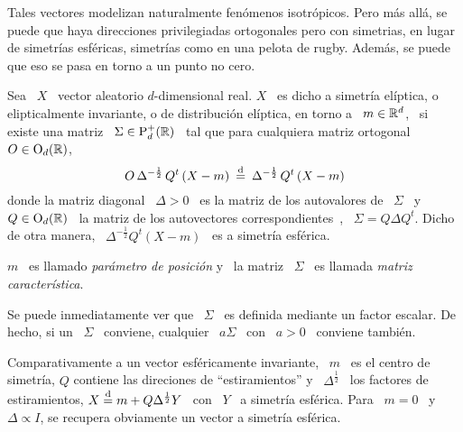 Tales  vectores  modelizan naturalmente  fen\'omenos  isotr\'opicos. Pero  m\'as
all\'a,  se  puede  que  haya  direcciones privilegiadas  ortogonales  pero  con
simetrias,  \ie en  lugar de  simetr\'ias esf\'ericas,  simetr\'ias como  en una
pelota de rugby. Adem\'as, se puede que eso se pasa en torno a un punto no cero.
%
\begin{definicion}
%
  Sea  \  $X$  \ vector  aleatorio  $d$-dimensional  real.   $X$  \ es  dicho  a
  simetr\'ia  el\'iptica,  o  elipticalmente  invariante,  o  de  distribuci\'on
  el\'iptica, en torno a \ $m \in \mathbb{R}^d$, \ si existe una matriz \ $\Sigma \in
  \mathrm{P}_d^+(\mathbb{R})$  \  tal  que  para   cualquiera  matriz  ortogonal  \  $O  \in
  \mathrm{O}_d(\mathbb{R})$,
  \[
  O  \,   \Delta^{-\frac12}  \,  Q^t  \left(   X  -  m  \right)   \:  \stackrel{\mathrm{d}}{=}  \:
  \Delta^{-\frac12} \, Q^t \left( X - m \right)
  \]
  donde la matriz diagonal \ $\Delta > 0$ \ es la matriz de los autovalores de \
  $\Sigma$  \  y  \ $Q  \in  \mathrm{O}_d(\mathbb{R})$  \  la  matriz de  los  autovectores
  correspondientes~\cite{Bha97,   Bha07,  HorJoh13},  \   $\Sigma  =   Q  \Delta
  Q^t$. Dicho de  otra manera, \ $\Delta^{-\frac12} Q^t \left( X  - m \right)$ \
  es a simetr\'ia esf\'erica.

  $m$ \ es llamado {\em par\'ametro de posici\'on} y \ la matriz \ $\Sigma$ \ es
  llamada {\em matriz caracter\'istica}.
\end{definicion}
%
Se puede  inmediatamente ver  que \  $\Sigma$ \ es  definida mediante  un factor
escalar. De hecho, si  un \ $\Sigma$ \ conviene, cualquier \  $a \Sigma$ \ con \
$a > 0$ \ conviene tambi\'en.

Comparativamente a un vector esf\'ericamente invariante, \ $m$ \ es el centro de
simetr\'ia,   $Q$   contiene   las   direciones   de   ``estiramientos''   y   \
$\Delta^{\frac12}$  \   los  factores  de   estiramientos,  $X  \stackrel{\mathrm{d}}{=}  m   +  Q
\Delta^{\frac12} Y$ \ con \ $Y$ \ a  simetr\'ia esf\'erica. Para \ $m = 0$ \ y \
$\Delta \propto I$, se recupera obviamente un vector a simetr\'ia esf\'erica.


